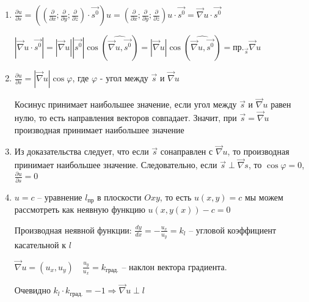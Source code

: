 \documentclass[12pt]{article}
\begin{document}
    \begin{enumerate}
        \item \begin{MyProof}
            $\frac{\partial u}{\partial s} = \left(\left(\frac{\partial}{\partial x}; \frac{\partial}{\partial y}; \frac{\partial}{\partial z}\right) \cdot \vec{s^0}\right) u = \left(\frac{\partial}{\partial x}; \frac{\partial}{\partial y}; \frac{\partial}{\partial z}\right) u \cdot \vec{s^0} =
            \vec\nabla u \cdot \vec{s^0}$
            
            $|\vec\nabla u \cdot \vec{s^0}| = |\vec\nabla u| |\vec{s^0}| \cos(\widehat{\vec\nabla u, \vec{s^0}}) =
            |\vec\nabla u| \cos(\widehat{\vec\nabla u, \vec{s^0}}) = \text{пр.}_{\vec{s}} \vec\nabla u$
        \end{MyProof}

        \item \begin{MyProof}
            $\frac{\partial u}{\partial s} = |\vec\nabla u| \cos\varphi$, где $\varphi$ - угол между $\vec{s}$ и $\vec\nabla u$

            Косинус принимает наибольшее значение, если угол между $\vec{s}$ и $\vec\nabla u$ равен нулю, то есть направления векторов совпадает. Значит, при $\vec{s} = \vec\nabla u$ производная принимает наибольшее значение
        \end{MyProof}

        \item \begin{MyProof}
            Из доказательства  следует, что если $\vec{s}$ сонаправлен с $\vec\nabla u$, то производная принимает наибольшее значение. Следовательно, если $\vec{s} \perp \vec\nabla s$, то $\cos\varphi = 0$, $\frac{\partial u}{\partial s} = 0$
        \end{MyProof}

        \item \begin{MyProof}
            $u = c$ -- уравнение $l_{\text{пр}}$ в плоскости $Oxy$, то есть $u(x, y) = c$ мы можем рассмотреть как неявную функцию $u(x, y(x)) - c = 0$

            Производная неявной функции: $\frac{dy}{dx} = -\frac{u_x}{u_y} = k_l$ -- угловой коэффициент касательной к $l$

            $\vec\nabla u = (u_x, u_y) \quad \frac{u_y}{u_x} = k_{\text{град.}}$ -- наклон вектора градиента.

            Очевидно $k_l \cdot k_{\text{град.}} = -1 \Longrightarrow \vec\nabla u \perp l$
        \end{MyProof}
    \end{enumerate}
\end{document}
